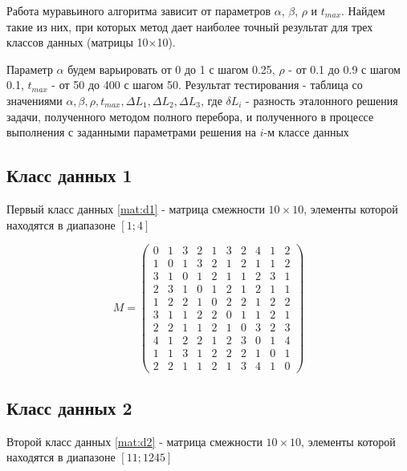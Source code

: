 \documentclass[12pt]{report}
\begin{document}
	Работа муравьиного алгоритма зависит от параметров $\alpha$, $\beta$, $\rho$ и $t_{max}$. Найдем такие из них, при которых метод дает наиболее точный результат для трех классов данных (матрицы 10$\times$10).
	
	Параметр $\alpha$ будем варьировать от 0 до 1 с шагом 0.25, $\rho$  - от 0.1 до 0.9 с шагом 0.1, $t_{max}$ - от 50 до 400 с шагом 50. Результат тестирования - таблица со значениями $\alpha, \beta, \rho, t_{max}, \Delta L_{1}, \Delta L_{2}, \Delta L_{3}$, где $\delta L_{i}$ - разность эталонного решения задачи, полученного методом полного перебора, и полученного в процессе выполнения с заданными параметрами решения на $i$-м классе данных\\
	
	\subsection*{Класс данных 1}
	Первый класс данных \ref{mat:d1} - матрица смежности $10\times10$, элементы которой находятся в диапазоне $[1;4]$
	
	\begin{equation}
		\label{mat:d1}
		M = 
		\begin{pmatrix} 
			0 & 1 & 3 & 2 & 1 & 3 & 2 & 4 & 1 & 2 \\
			1 & 0 & 1 & 3 & 2 & 1 & 2 & 1 & 1 & 2 \\
			3 & 1 & 0 & 1 & 2 & 1 & 1 & 2 & 3 & 1 \\
			2 & 3 & 1 & 0 & 1 & 2 & 1 & 2 & 1 & 1 \\
			1 & 2 & 2 & 1 & 0 & 2 & 2 & 1 & 2 & 2 \\
			3 & 1 & 1 & 2 & 2 & 0 & 1 & 1 & 2 & 1 \\
			2 & 2 & 1 & 1 & 2 & 1 & 0 & 3 & 2 & 3 \\
			4 & 1 & 2 & 2 & 1 & 2 & 3 & 0 & 1 & 4 \\
			1 & 1 & 3 & 1 & 2 & 2 & 2 & 1 & 0 & 1 \\
			2 & 2 & 1 & 1 & 2 & 1 & 3 & 4 & 1 & 0
		\end{pmatrix}
	\end{equation}
	
	\subsection*{Класс данных 2}
	Второй класс данных \ref{mat:d2} - матрица смежности $10\times10$, элементы которой находятся в диапазоне $[11;1245]$
	
\end{document}
